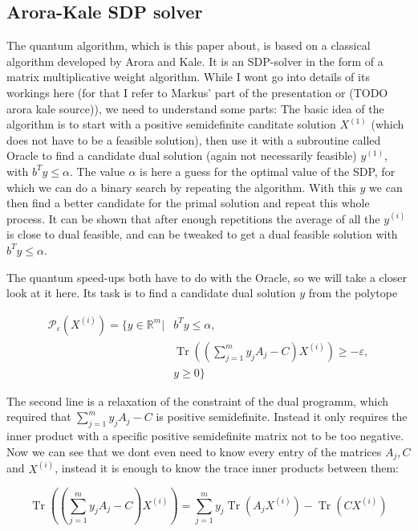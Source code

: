 \documentclass[11pt,a4paper]{scrartcl}
\DeclareMathOperator{\Tr}{Tr}
\newcommand{\R}{\mathbb{R}}
\begin{document}
\subsection{Arora-Kale SDP solver}
The quantum algorithm, which is this paper about, is based on a classical algorithm developed by Arora and Kale. It is an SDP-solver in the form of a matrix multiplicative weight algorithm. While I wont go into details of its workings here (for that I refer to Markus' part of the presentation or (TODO arora kale source)), we need to understand some parts: The basic idea of the algorithm is to start with a positive semidefinite canditate solution $X^{(1)}$ (which does not have to be a feasible solution), then use it with a subroutine called Oracle to find a candidate  dual solution (again not necessarily feasible) $y^{(1)}$, with $b^Ty\leq\alpha$. The value $\alpha$ is here a guess for the optimal value of the SDP, for which we can do a binary search by repeating the algorithm. With this $y$ we can then find a better candidate for the primal solution and repeat this whole process. It can be shown that after enough repetitions the average of all the $y^{(i)}$ is close to dual feasible, and can be tweaked to get a dual feasible solution with $b^Ty\leq\alpha$.

The quantum speed-ups both have to do with the Oracle, so we will take a closer look at it here. Its task is to find a candidate dual solution $y$ from the polytope

\begin{align*}
\mathcal{P}_\varepsilon (X^{(i)})=\{y\in\R^m | &b^Ty\leq\alpha,\\
 &\Tr\left(\left(\sum_{j=1}^m y_jA_j-C\right)X^{(i)}\right)\geq -\varepsilon,\\
 & y\geq 0\}
\end{align*}

The second line is a relaxation of the constraint of the dual programm, which required that $\sum_{j=1}^m y_jA_j-C$ is positive semidefinite.  Instead it only requires the inner product with a specific positive semidefinite matrix not to be too negative. 
Now we can see that we dont even need to know every entry of the matrices $A_j, C$ and $X^{(i)}$, instead it is enough to know the trace inner products between them:

\begin{equation*}
\Tr\left(\left(\sum_{j=1}^m y_jA_j-C\right)X^{(i)}\right)=\sum_{j=1}^m y_j \Tr(A_jX^{(i)})-\Tr(CX^{(i)})
\end{equation*}
\end{document}
